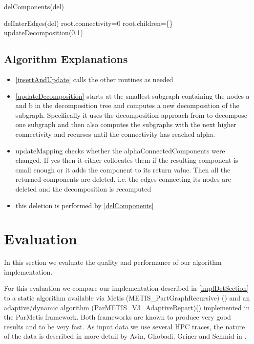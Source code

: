\documentclass[a4paper,xcolor=dvipsnames, tikz, 12pt]{article}
\newcommand{\nl}{\newline}
\theoremstyle{definition}
\begin{document}
\begin{algorithm}
	\caption{delComponents(del)}
	\label{delComponents}
	\begin{algorithmic}
		\STATE delInterEdges(del)
		\STATE root.connectivity=0
		\STATE root.children=\{\}
		\STATE updateDecomposition(0,1)
	\end{algorithmic}
\end{algorithm}


\subsection{Algorithm Explanations}
\begin{itemize}
	\item \cref{insertAndUpdate} calls the other routines as needed
	\item \cref{updateDecomposition} starts at the smallest subgraph containing the nodes a and b in the decomposition tree and computes a new decomposition of the subgraph. Specifically it uses the decomposition approach from \cite{Chang2013} to decompose one subgraph and then also computes the subgraphs with the next higher connectivity and recurses until the connectivity has reached alpha.
	\item updateMapping checks whether the alphaConnectedComponents were changed. If yes then it either collocates them if the resulting component is small enough or it adds the component to its return value. Then all the returned components are deleted, i.e. the edges connecting its nodes are deleted and the decomposition is recomputed
	\item this deletion is performed by \cref{delComponents}
\end{itemize}


\section{Evaluation}
In this section we evaluate the quality and performance of our algorithm implementation.


For this evaluation we compare our implementation described in \cref{implDetSection} to a static algorithm available via Metis (METIS\_PartGraphRecursive) (\cite{Karypis1998, Karypis1998a}) and an adaptive/dynamic algorithm (ParMETIS\_V3\_AdaptiveRepart)(\cite{Karypis1999, Schloegel1997, Schloegel2000}) implemented in the ParMetis framework. Both frameworks are known to produce very good results and to be very fast.\nl
As input data we use several HPC traces, the nature of the data is described in more detail by Avin, Ghobadi, Griner and Schmid in \cite{Avin2019}.
\end{document}
